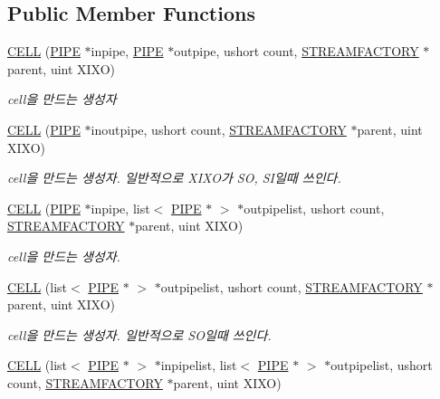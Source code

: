\subsection*{Public Member Functions}
\begin{DoxyCompactItemize}
\item 
\hyperlink{classCELL_a266db2529e185e3f0f653f874c783c54}{C\+E\+L\+L} (\hyperlink{classPIPE}{P\+I\+P\+E} $\ast$inpipe, \hyperlink{classPIPE}{P\+I\+P\+E} $\ast$outpipe, ushort count, \hyperlink{classSTREAMFACTORY}{S\+T\+R\+E\+A\+M\+F\+A\+C\+T\+O\+R\+Y} $\ast$parent, uint X\+I\+X\+O)
\begin{DoxyCompactList}\small\item\em cell을 만드는 생성자 \end{DoxyCompactList}\item 
\hyperlink{classCELL_a8dcb65b2c6869145de9cf5056d7fe356}{C\+E\+L\+L} (\hyperlink{classPIPE}{P\+I\+P\+E} $\ast$inoutpipe, ushort count, \hyperlink{classSTREAMFACTORY}{S\+T\+R\+E\+A\+M\+F\+A\+C\+T\+O\+R\+Y} $\ast$parent, uint X\+I\+X\+O)
\begin{DoxyCompactList}\small\item\em cell을 만드는 생성자. 일반적으로 X\+I\+X\+O가 S\+O, S\+I일때 쓰인다. \end{DoxyCompactList}\item 
\hyperlink{classCELL_ae82291f0f5dd18ef2ba31e6af1a74e09}{C\+E\+L\+L} (\hyperlink{classPIPE}{P\+I\+P\+E} $\ast$inpipe, list$<$ \hyperlink{classPIPE}{P\+I\+P\+E} $\ast$ $>$ $\ast$outpipelist, ushort count, \hyperlink{classSTREAMFACTORY}{S\+T\+R\+E\+A\+M\+F\+A\+C\+T\+O\+R\+Y} $\ast$parent, uint X\+I\+X\+O)
\begin{DoxyCompactList}\small\item\em cell을 만드는 생성자. \end{DoxyCompactList}\item 
\hyperlink{classCELL_a2fad68b40d0adbecfee691618c256518}{C\+E\+L\+L} (list$<$ \hyperlink{classPIPE}{P\+I\+P\+E} $\ast$ $>$ $\ast$outpipelist, ushort count, \hyperlink{classSTREAMFACTORY}{S\+T\+R\+E\+A\+M\+F\+A\+C\+T\+O\+R\+Y} $\ast$parent, uint X\+I\+X\+O)
\begin{DoxyCompactList}\small\item\em cell을 만드는 생성자. 일반적으로 S\+O일때 쓰인다. \end{DoxyCompactList}\item 
\hyperlink{classCELL_a42a40e06fa704cbe13e1a5fbfaaaafdd}{C\+E\+L\+L} (list$<$ \hyperlink{classPIPE}{P\+I\+P\+E} $\ast$ $>$ $\ast$inpipelist, list$<$ \hyperlink{classPIPE}{P\+I\+P\+E} $\ast$ $>$ $\ast$outpipelist, ushort count, \hyperlink{classSTREAMFACTORY}{S\+T\+R\+E\+A\+M\+F\+A\+C\+T\+O\+R\+Y} $\ast$parent, uint X\+I\+X\+O)

\end{DoxyCompactItemize}

